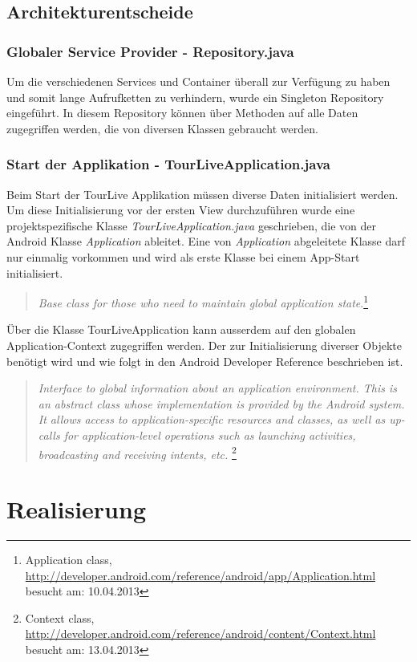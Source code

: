 \subsection{Architekturentscheide}

\subsubsection{Globaler Service Provider - Repository.java}
Um die verschiedenen Services und Container überall zur Verfügung zu haben und somit lange Aufrufketten zu verhindern, wurde ein Singleton Repository eingeführt. In diesem Repository können über Methoden auf alle Daten zugegriffen werden, die von diversen Klassen gebraucht werden.

\subsubsection{Start der Applikation - TourLiveApplication.java}
Beim Start der TourLive Applikation müssen diverse Daten initialisiert werden. Um diese Initialisierung vor der ersten View durchzuführen wurde eine projektspezifische Klasse \textit{TourLiveApplication.java} geschrieben, die von der Android Klasse \textit{Application} ableitet. Eine von \textit{Application} abgeleitete Klasse darf nur einmalig vorkommen und wird als erste Klasse bei einem App-Start initialisiert.
\begin{quotation}
\textit{Base class for those who need to maintain global application state}.\footnote{Application class, \url{http://developer.android.com/reference/android/app/Application.html} besucht am: 10.04.2013}
\end{quotation}
Über die Klasse TourLiveApplication kann ausserdem auf den globalen Application-Context zugegriffen werden. Der zur Initialisierung diverser Objekte benötigt wird und wie folgt in den Android Developer Reference beschrieben ist.
\begin{quotation}
\textit{Interface to global information about an application environment. This is an abstract class whose implementation is provided by the Android system. It allows access to application-specific resources and classes, as well as up-calls for application-level operations such as launching activities, broadcasting and receiving intents, etc. }\footnote{Context class, \url{http://developer.android.com/reference/android/content/Context.html} besucht am: 13.04.2013}
\end{quotation}


\section{Realisierung}

